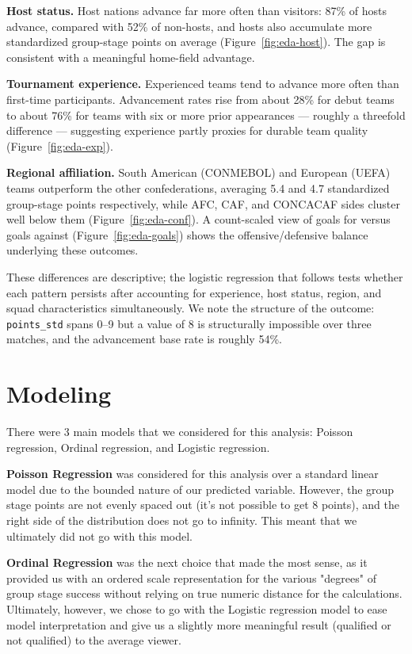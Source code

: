 \documentclass{article}
\begin{document}
\textbf{Host status.} Host nations advance far more often than visitors: 87\% of hosts advance, compared with 52\% of non-hosts, and hosts also accumulate more standardized group-stage points on average (Figure~\ref{fig:eda-host}). The gap is consistent with a meaningful home-field advantage.

\textbf{Tournament experience.} Experienced teams tend to advance more often than first-time participants. Advancement rates rise from about 28\% for debut teams to about 76\% for teams with six or more prior appearances --- roughly a threefold difference --- suggesting experience partly proxies for durable team quality (Figure~\ref{fig:eda-exp}).

\textbf{Regional affiliation.} South American (CONMEBOL) and European (UEFA) teams outperform the other confederations, averaging 5.4 and 4.7 standardized group-stage points respectively, while AFC, CAF, and CONCACAF sides cluster well below them (Figure~\ref{fig:eda-conf}). A count-scaled view of goals for versus goals against (Figure~\ref{fig:eda-goals}) shows the offensive/defensive balance underlying these outcomes.

These differences are descriptive; the logistic regression that follows tests whether each pattern persists after accounting for experience, host status, region, and squad characteristics simultaneously. We note the structure of the outcome: \texttt{points\_std} spans 0--9 but a value of 8 is structurally impossible over three matches, and the advancement base rate is roughly 54\%.


\vspace{1.8em}

\section{Modeling}

There were 3 main models that we considered for this analysis: Poisson regression, Ordinal regression, and Logistic regression.

    \textbf{Poisson Regression} was considered for this analysis over a standard linear model due to the bounded nature of our predicted variable. However, the group stage points are not evenly spaced out (it's not possible to get 8 points), and the right side of the distribution does not go to infinity. This meant that we ultimately did not go with this model.
    \vspace{0.8em}
    
    \textbf{Ordinal Regression} was the next choice that made the most sense, as it provided us with an ordered scale representation for the various "degrees" of group stage success without relying on true numeric distance for the calculations. Ultimately, however, we chose to go with the Logistic regression model to ease model interpretation and give us a slightly more meaningful result (qualified or not qualified) to the average viewer.
    \vspace{0.8em}
\end{document}
